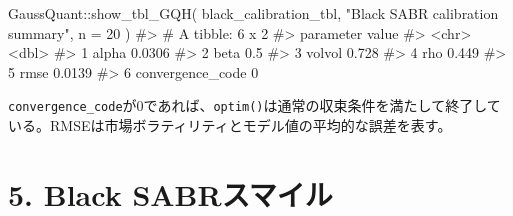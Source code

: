 \documentclass[
  letterpaper,
  DIV=11,
  numbers=noendperiod]{scrreprt}
\newenvironment{Shaded}{\begin{snugshade}}{\end{snugshade}}
\newcommand{\AttributeTok}[1]{\textcolor[rgb]{0.40,0.45,0.13}{#1}}
\newcommand{\CommentTok}[1]{\textcolor[rgb]{0.37,0.37,0.37}{#1}}
\newcommand{\DecValTok}[1]{\textcolor[rgb]{0.68,0.00,0.00}{#1}}
\newcommand{\FunctionTok}[1]{\textcolor[rgb]{0.28,0.35,0.67}{#1}}
\newcommand{\NormalTok}[1]{\textcolor[rgb]{0.00,0.23,0.31}{#1}}
\newcommand{\SpecialCharTok}[1]{\textcolor[rgb]{0.37,0.37,0.37}{#1}}
\newcommand{\StringTok}[1]{\textcolor[rgb]{0.13,0.47,0.30}{#1}}
\begin{document}
\begin{Shaded}
\begin{Highlighting}[]
\NormalTok{GaussQuant}\SpecialCharTok{::}\FunctionTok{show\_tbl\_GQH}\NormalTok{(}
\NormalTok{  black\_calibration\_tbl,}
  \StringTok{"Black SABR calibration summary"}\NormalTok{,}
  \AttributeTok{n =} \DecValTok{20}
\NormalTok{)}
\CommentTok{\#\textgreater{} \# A tibble: 6 x 2}
\CommentTok{\#\textgreater{}   parameter         value}
\CommentTok{\#\textgreater{}   \textless{}chr\textgreater{}             \textless{}dbl\textgreater{}}
\CommentTok{\#\textgreater{} 1 alpha            0.0306}
\CommentTok{\#\textgreater{} 2 beta             0.5   }
\CommentTok{\#\textgreater{} 3 volvol           0.728 }
\CommentTok{\#\textgreater{} 4 rho              0.449 }
\CommentTok{\#\textgreater{} 5 rmse             0.0139}
\CommentTok{\#\textgreater{} 6 convergence\_code 0}
\end{Highlighting}
\end{Shaded}

\texttt{convergence\_code}が0であれば、\texttt{optim()}は通常の収束条件を満たして終了している。RMSEは市場ボラティリティとモデル値の平均的な誤差を表す。

\section{5. Black
SABRスマイル}\label{black-sabrux30b9ux30deux30a4ux30eb}
\end{document}
